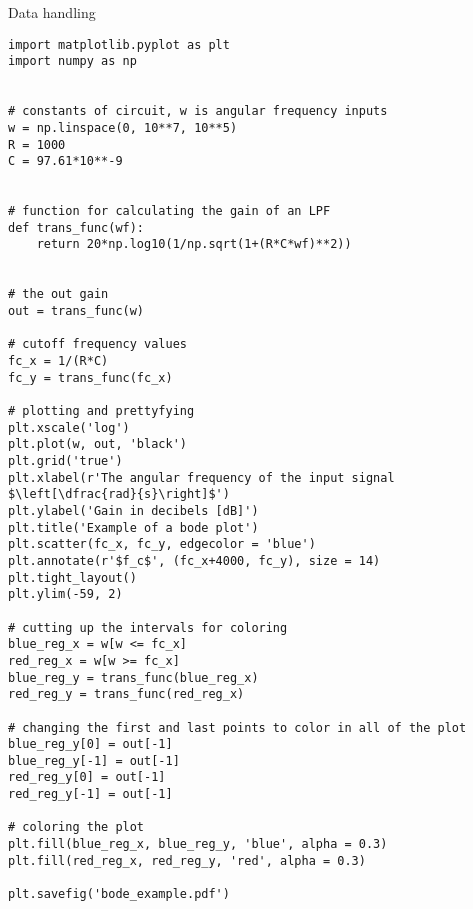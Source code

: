 \lstlistingname{ Data handling}
\begin{lstlisting}[breaklines]
import matplotlib.pyplot as plt
import numpy as np


# constants of circuit, w is angular frequency inputs
w = np.linspace(0, 10**7, 10**5)
R = 1000
C = 97.61*10**-9


# function for calculating the gain of an LPF
def trans_func(wf):
    return 20*np.log10(1/np.sqrt(1+(R*C*wf)**2))


# the out gain
out = trans_func(w)

# cutoff frequency values
fc_x = 1/(R*C)
fc_y = trans_func(fc_x)

# plotting and prettyfying
plt.xscale('log')
plt.plot(w, out, 'black')
plt.grid('true')
plt.xlabel(r'The angular frequency of the input signal $\left[\dfrac{rad}{s}\right]$')
plt.ylabel('Gain in decibels [dB]')
plt.title('Example of a bode plot')
plt.scatter(fc_x, fc_y, edgecolor = 'blue')
plt.annotate(r'$f_c$', (fc_x+4000, fc_y), size = 14)
plt.tight_layout()
plt.ylim(-59, 2)

# cutting up the intervals for coloring
blue_reg_x = w[w <= fc_x]
red_reg_x = w[w >= fc_x]
blue_reg_y = trans_func(blue_reg_x)
red_reg_y = trans_func(red_reg_x)

# changing the first and last points to color in all of the plot
blue_reg_y[0] = out[-1]
blue_reg_y[-1] = out[-1]
red_reg_y[0] = out[-1]
red_reg_y[-1] = out[-1]

# coloring the plot
plt.fill(blue_reg_x, blue_reg_y, 'blue', alpha = 0.3)
plt.fill(red_reg_x, red_reg_y, 'red', alpha = 0.3)

plt.savefig('bode_example.pdf')

\end{lstlisting}